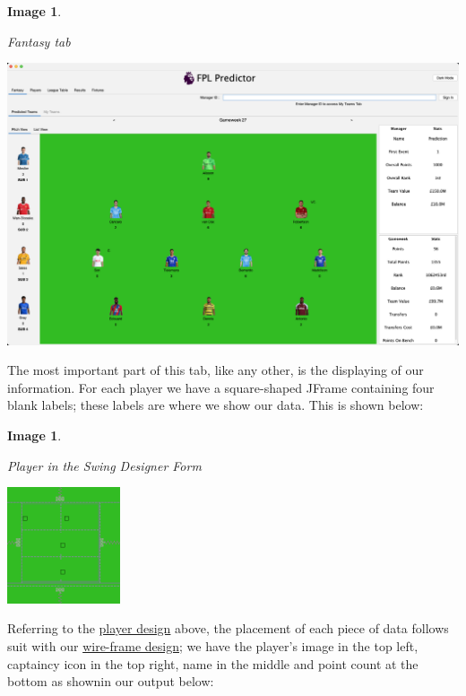 \documentclass[12pt, a4paper, oneside]{book}
\newtheorem{image}[theorem]{Image}
\numberwithin{equation}{section}
\begin{document}
\begin{image} \label{Fantasy tab}

  Fantasy tab

  \vspace{0.5cm}

  \centerline{\includegraphics[width=1\textwidth]{images/gui/fantasy-tab/output.png}}

\end{image}

The most important part of this tab, like any other, is the displaying of our information. For each player we have a square-shaped JFrame containing four blank labels; these labels are where we show our data. This is shown below:

\begin{image} \label{Player in the Swing Designer Form}

  Player in the Swing Designer Form

  \vspace{0.5cm}

  \centerline{\includegraphics[width=0.25\textwidth]{images/gui/fantasy-tab/player-form.png}}

\end{image}

Referring to the \hyperref[Player in the Swing Designer Form]{player design} above, the placement of each piece of data follows suit with our \hyperref[Main page wire-frame]{wire-frame design}; we have the player's image in the top left, captaincy icon in the top right, name in the middle and point count at the bottom as shownin our output below:
\end{document}
